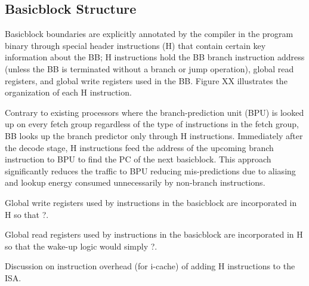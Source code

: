\subsection{Basicblock Structure}
\label{sec:bb_struct}

Basicblock boundaries are explicitly annotated by the compiler in the program
binary through special header instructions (H) that contain certain key
information about the BB; H instructions hold the BB branch instruction address
(unless the BB is terminated without a branch or jump operation), global read
registers, and global write registers used in the BB. Figure XX illustrates the
organization of each H instruction.

Contrary to existing processors where the branch-prediction unit (BPU) is looked
up on every fetch group regardless of the type of instructions in the fetch
group, BB looks up the branch predictor only through H instructions. Immediately
after the decode stage, H instructions feed the address of the upcoming branch
instruction to BPU to find the PC of the next basicblock. This approach
significantly reduces the traffic to BPU reducing mis-predictions due to
aliasing and lookup energy consumed unnecessarily by non-branch instructions.

Global write registers used by instructions in the basicblock are incorporated
in H so that ?.

Global read registers used by instructions in the basicblock are incorporated
in H so that the wake-up logic would simply ?.

Discussion on instruction overhead (for i-cache) of adding H instructions to the ISA.
